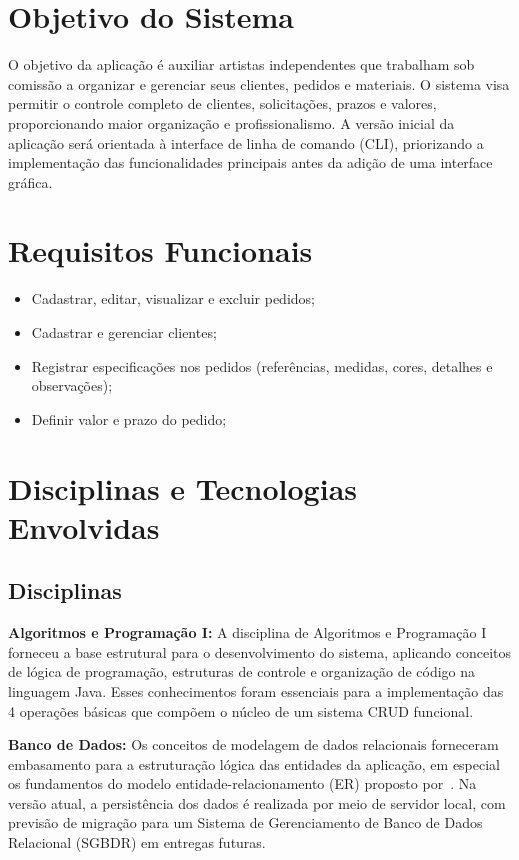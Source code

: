 \section{Objetivo do Sistema}
O objetivo da aplicação é auxiliar artistas independentes que trabalham sob 
comissão a organizar e gerenciar seus clientes, pedidos e materiais. O sistema 
visa permitir o controle completo de clientes, solicitações, prazos e valores, 
proporcionando maior organização e profissionalismo. A versão inicial da aplicação será orientada 
à interface de linha de comando (CLI), priorizando a implementação das 
funcionalidades principais antes da adição de uma interface gráfica.

\section{Requisitos Funcionais}
\begin{itemize}
    \item Cadastrar, editar, visualizar e excluir pedidos;
    \item Cadastrar e gerenciar clientes;
    \item Registrar especificações nos pedidos 
    (referências, medidas, cores, detalhes e observações);
    \item Definir valor e prazo do pedido;
\end{itemize}

\section{Disciplinas e Tecnologias Envolvidas}

\subsection{Disciplinas}

\textbf{Algoritmos e Programação I:}
A disciplina de Algoritmos e Programação I forneceu a base estrutural 
para o desenvolvimento do sistema, aplicando conceitos de lógica de 
programação, estruturas de controle e organização de código na linguagem 
Java. Esses conhecimentos foram essenciais para a implementação das 4 
operações básicas que compõem o núcleo de um sistema CRUD funcional.

\textbf{Banco de Dados:}
Os conceitos de modelagem de dados relacionais forneceram embasamento 
para a estruturação lógica das entidades da aplicação, em especial os 
fundamentos do modelo entidade-relacionamento (ER) proposto por~\cite{chen1976}. Na 
versão atual, a persistência dos dados é realizada por meio de servidor local, 
com previsão de migração para um Sistema de Gerenciamento de Banco de Dados 
Relacional (SGBDR) em entregas futuras.

